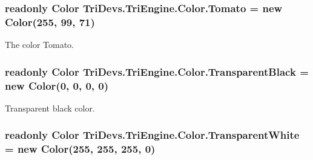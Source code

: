 \hypertarget{struct_tri_devs_1_1_tri_engine_1_1_color_add4736c87756a59520f41ac63512c38a}{
\subsubsection[{Tomato}]{\setlength{\rightskip}{0pt plus 5cm}readonly {\bf Color} Tri\-Devs.\-Tri\-Engine.\-Color.\-Tomato = new {\bf Color}(255, 99, 71)\hspace{0.3cm}{\ttfamily [static]}}}\label{struct_tri_devs_1_1_tri_engine_1_1_color_add4736c87756a59520f41ac63512c38a}


The color Tomato. 

\hypertarget{struct_tri_devs_1_1_tri_engine_1_1_color_a435d7e368cb42f983118cb46ef4390ab}{
\subsubsection[{Transparent\-Black}]{\setlength{\rightskip}{0pt plus 5cm}readonly {\bf Color} Tri\-Devs.\-Tri\-Engine.\-Color.\-Transparent\-Black = new {\bf Color}(0, 0, 0, 0)\hspace{0.3cm}{\ttfamily [static]}}}\label{struct_tri_devs_1_1_tri_engine_1_1_color_a435d7e368cb42f983118cb46ef4390ab}


Transparent black color. 

\hypertarget{struct_tri_devs_1_1_tri_engine_1_1_color_aa1b8bd27f2db1799a960c9aaad61beb7}{
\subsubsection[{Transparent\-White}]{\setlength{\rightskip}{0pt plus 5cm}readonly {\bf Color} Tri\-Devs.\-Tri\-Engine.\-Color.\-Transparent\-White = new {\bf Color}(255, 255, 255, 0)\hspace{0.3cm}{\ttfamily [static]}}}\label{struct_tri_devs_1_1_tri_engine_1_1_color_aa1b8bd27f2db1799a960c9aaad61beb7}


